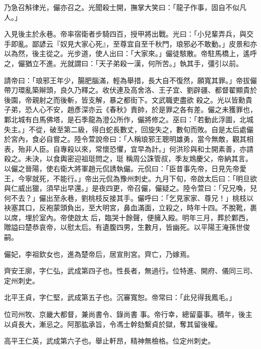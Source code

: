 \begin{pinyinscope}
 乃急召斛律光，儼亦召之。光聞殺士開，撫掌大笑曰：「龍子作事，固自不似凡人。」



 入見後主於永巷。帝率宿衛者步騎四百，授甲將出戰。光曰：「小兒輩弄兵，與交
 手即亂。鄙諺云『奴見大家心死』，至尊宜自至千秋門，琅邪必不敢動。」皮景和亦以為然，後主從之。光步道，使人出曰：「大家來。」儼徒駭散。帝駐馬橋上，遙呼之，儼猶立不進。光就謂曰：「天子弟殺一漢，何所苦。」執其手，彊引以前。



 請帝曰：「琅邪王年少，腸肥腦滿，輕為舉措，長大自不復然，願寬其罪。」帝拔儼帶刀環亂築辮頭，良久乃釋之。收伏連及高舍洛、王子宜、劉辟疆、都督翟顯貴於後園，帝親射之而後斬，皆支解，暴之都街下。文武職吏盡欲
 殺之。光以皆勳貴子弟，恐人心不安，趙彥深亦云《春秋》責帥，於是罪之各有差。儼之未獲罪也，鄴北城有白馬佛塔，是石季龍為澄公所作，儼將修之。巫曰：「若動此浮圖，北城失主。」不從，破至第二級，得白蛇長數丈，回旋失之，數旬而敗。自是太后處儼於宮內，食必自嘗之。陸令萱說帝曰：「人稱琅邪王聰明雄勇，當今無敵，觀其相表，殆非人臣。自專殺以來，常懷恐懼，宜早為計。」何洪珍與和士開素善，亦請殺之。未決，以食輿密迎祖珽問之，珽
 稱周公誅管叔，季友鴆慶父，帝納其言。以儼之晉陽，使右衛大將軍趙元侃誘執儼。元侃曰：「臣昔事先帝，日見先帝愛王，今寧就死，不能行。」帝出元侃為豫州刺史。九月下旬，帝啟太后曰：「明旦欲與仁威出獵，須早出早還。」是夜四更，帝召儼，儼疑之。陸令萱曰：「兄兄喚，兒何不去？」儼出至永巷，劉桃枝反接其手。儼呼曰：「乞見家家、尊兄！」桃枝以袂塞其口，反袍蒙頭負出，至大明宮，鼻血滿面，立殺之，時年十四。不脫靴，裹以席，埋於室內。帝使啟太
 后，臨哭十餘聲，便擁入殿。明年三月，葬於鄴西，贈謚曰楚恭哀帝，以慰太后。有遺腹四男，生數月，皆幽死。以平陽王淹孫世俊嗣。



 儼妃，李祖欽女也，進為楚帝后，居宣則宮。齊亡，乃嫁焉。



 齊安王廓，字仁弘，武成第四子也。性長者，無過行。位特進、開府、儀同三司、定州刺史。



 北平王貞，字仁堅，武成第五子也。沉審寬恕。帝常曰：「此兒得我鳳毛。」



 位司州牧、京畿大都督，兼尚書令、錄尚書
 事。帝行幸，總留臺事。積年，後主以貞長大，漸忌之。阿那肱承旨，令馮士幹劾繫貞於獄，奪其留後權。



 高平王仁英，武成第六子也。舉止軒昂，精神無檢格。位定州刺史。




\end{pinyinscope}
